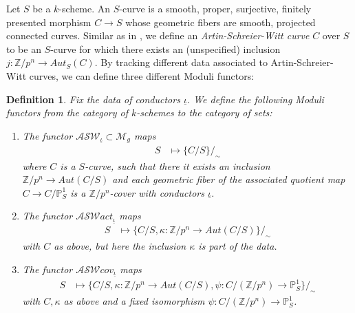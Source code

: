 \documentclass{compositio}
\newcommand{\mat}[1]{\todo[color=green]{MH: #1}}
\newtheorem{definition}[theorem]{Definition}
\theoremstyle{remark}
\theoremstyle{remark}
\DeclareMathOperator{\cov}{cov}
\begin{document}
Let $S$ be a $k$-scheme. An $S$-curve is a smooth, proper, surjective, finitely presented morphism $C \xrightarrow{} S$ whose geometric fibers are smooth, projected connected curves. Similar as in  \cite{MR2985514}, we define an \textit{Artin-Schreier-Witt curve} $C$ over $S$ to be an $S$-curve for which there exists an (unspecified) inclusion $j: \mathbb{Z}/p^n \to Aut_S(C)$. By tracking different data associated to Artin-Schreier-Witt curves, we can define three different Moduli functors:
 \begin{definition}
 Fix the data of conductors $\underline{\iota}$. We define the following Moduli functors from the category of  $k$-schemes to the category of sets:
     \begin{enumerate}
         \item The functor $\mathcal{ASW}_{\underline{\iota}} \subset \mathcal{M}_g$ maps
         \begin{align}
              S & \mapsto \{ C/S \}/_{\sim}
         \end{align}
         where $C$ is a $S$-curve, such that there it exists an inclusion $\mathbb{Z}/p^n \to Aut(C/S)$ and each geometric fiber of the associated quotient map $C \to C/\mathbb{P}^1_S$ is a $\mathbb{Z}/p^n$-cover with conductors $\underline{\iota}$.
         \item The functor $\mathcal{ASW}act_{\underline{\iota}}$ maps
         \begin{align}
              S & \mapsto \{ C/S, \kappa:  \mathbb{Z}/p^n \to Aut(C/S) \}/_{\sim}
         \end{align}
         with $C$ as above, but here the inclusion $\kappa$ is part of the data.
         \item The functor $\mathcal{ASW}cov_{\underline{\iota}}$ maps
         \begin{align}
              S & \mapsto \{ C/S, \kappa:  \mathbb{Z}/p^n \to Aut(C/S), \psi: C/(\mathbb{Z}/p^n) \to \mathbb{P}^1_S \}/_{\sim}
         \end{align}
         with $C, \kappa$ as above and a fixed isomorphism $\psi:  C/(\mathbb{Z}/p^n) \to \mathbb{P}^1_S$.
     \end{enumerate}
 \end{definition}
\end{document}

